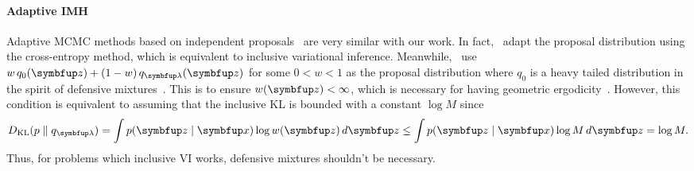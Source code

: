 \paragraph{Adaptive IMH}
Adaptive MCMC methods based on independent proposals~\citep{keith_adaptive_2008, holden_adaptive_2009, giordani_adaptive_2010} are very similar with our work.
In fact,~\citet{keith_adaptive_2008} adapt the proposal distribution using the cross-entropy method, which is equivalent to inclusive variational inference.
Meanwhile,~\citet{giordani_adaptive_2010} use \(w\,q_0(\vz) + (1-w)\,q_{\vlambda}(\vz)\) for some \(0<w<1\) as the proposal distribution where \(q_0\) is a heavy tailed distribution in the spirit of defensive mixtures~\citep{hesterberg_weighted_1995}.
This is to ensure \(w(\vz) < \infty\), which is necessary for having geometric ergodicity~\citep{mengersen_rates_1996}.
However, this condition is equivalent to assuming that the inclusive KL is bounded with a constant \(\log M\) since
\begin{align}
  \DKL{p}{q_{\vlambda}} = \int p(\vz\mid\vx) \log w(\vz)\,d\vz \leq \int p(\vz\mid\vx) \log M \, d\vz = \log M.
\end{align}
Thus, for problems which inclusive VI works, defensive mixtures shouldn't be necessary.


